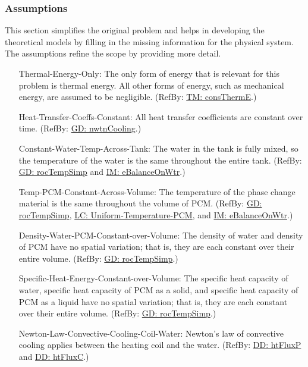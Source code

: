 \documentclass[12pt]{article}
\begin{document}
\subsubsection{Assumptions}
\label{Sec:Assumps}
This section simplifies the original problem and helps in developing the theoretical models by filling in the missing information for the physical system. The assumptions refine the scope by providing more detail.
\begin{itemize}
\item[Thermal-Energy-Only:\phantomsection\label{assumpTEO}]The only form of energy that is relevant for this problem is thermal energy. All other forms of energy, such as mechanical energy, are assumed to be negligible. (RefBy: \hyperref[TM:consThermE]{TM: consThermE}.)
\item[Heat-Transfer-Coeffs-Constant:\phantomsection\label{assumpHTCC}]All heat transfer coefficients are constant over time. (RefBy: \hyperref[GD:nwtnCooling]{GD: nwtnCooling}.)
\item[Constant-Water-Temp-Across-Tank:\phantomsection\label{assumpCWTAT}]The water in the tank is fully mixed, so the temperature of the water is the same throughout the entire tank. (RefBy: \hyperref[GD:rocTempSimp]{GD: rocTempSimp} and \hyperref[IM:eBalanceOnWtr]{IM: eBalanceOnWtr}.)
\item[Temp-PCM-Constant-Across-Volume:\phantomsection\label{assumpTPCAV}]The temperature of the phase change material is the same throughout the volume of PCM. (RefBy: \hyperref[GD:rocTempSimp]{GD: rocTempSimp}, \hyperref[likeChgUTP]{LC: Uniform-Temperature-PCM}, and \hyperref[IM:eBalanceOnWtr]{IM: eBalanceOnWtr}.)
\item[Density-Water-PCM-Constant-over-Volume:\phantomsection\label{assumpDWPCoV}]The density of water and density of PCM have no spatial variation; that is, they are each constant over their entire volume. (RefBy: \hyperref[GD:rocTempSimp]{GD: rocTempSimp}.)
\item[Specific-Heat-Energy-Constant-over-Volume:\phantomsection\label{assumpSHECov}]The specific heat capacity of water, specific heat capacity of PCM as a solid, and specific heat capacity of PCM as a liquid have no spatial variation; that is, they are each constant over their entire volume. (RefBy: \hyperref[GD:rocTempSimp]{GD: rocTempSimp}.)
\item[Newton-Law-Convective-Cooling-Coil-Water:\phantomsection\label{assumpLCCCW}]Newton's law of convective cooling applies between the heating coil and the water. (RefBy: \hyperref[DD:htFluxP]{DD: htFluxP} and \hyperref[DD:htFluxC]{DD: htFluxC}.)

\end{itemize}
\end{document}
